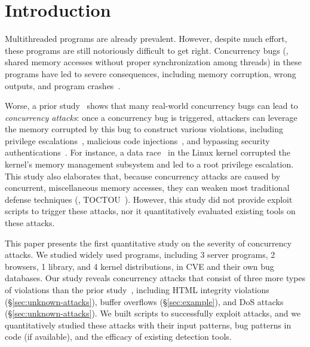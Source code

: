 \section{Introduction} \label{sec:intro}

Multithreaded programs are already prevalent. However, despite much effort, 
these programs are still notoriously difficult to get right. Concurrency bugs 
(\ie, shared memory accesses without proper synchronization among threads) in 
these programs have led to severe consequences, including memory corruption, 
wrong outputs, and program crashes~\cite{lu:concurrency-bugs}. 

Worse, a prior study~\cite{con:hotpar12} shows that many real-world 
concurrency bugs can lead to \emph{concurrency attacks}: once a concurrency bug 
is triggered, attackers can leverage the memory corrupted by this bug to 
construct various violations, including privilege 
escalations~\cite{uselib-bug-12791, mysql-bug-24988}, malicious code 
injections~\cite{berend-jan-wever-msiexploit}, and bypassing security 
authentications~\cite{xwindows,theotheriphone,theotheriphone-2011}. For 
instance, a data race~\cite{uselib-bug-12791} in the Linux kernel corrupted the 
kernel's memory management subsystem and led to a root privilege 
escalation. This study also elaborates that, because 
concurrency attacks are caused by concurrent, miscellaneous memory accesses, 
they can weaken most traditional defense techniques (\eg, 
TOCTOU~\cite{toctou:usec03,toctou:fast05,toctou:fast08}). However, this study 
did not provide exploit scripts to trigger these attacks, nor it quantitatively 
evaluated existing tools on these attacks.

This paper presents the first quantitative study on the severity of concurrency 
attacks. We studied \nprog widely used programs, including 3 server 
programs, 2 browsers, 1 library, and 4 kernel distributions, in CVE 
and their own bug databases. Our study reveals \nattacks concurrency attacks 
that consist of three more types of violations than the prior 
study~\cite{con:hotpar12}, including HTML integrity 
violations (\S\ref{sec:unknown-attacks}), buffer overflows 
(\S\ref{sec:example}), and DoS attacks (\S\ref{sec:unknown-attacks}). We 
built scripts to successfully exploit \nreproduced attacks, and we 
quantitatively studied these attacks with their input patterns, bug patterns in 
code (if available), and the efficacy of existing detection tools. 


